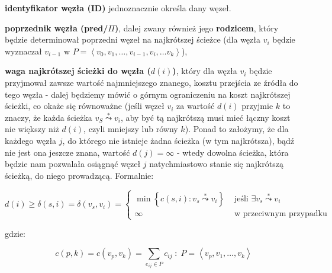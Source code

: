 \begin{myitemize}

\item \textbf{identyfikator węzła (ID)} jednoznacznie określa dany węzeł.

\item \textbf{poprzednik węzła (pred/$\Pi$)}, dalej zwany również jego \textbf{rodzicem}, który będzie determinował poprzedni węzeł na najkrótszej ścieżce (dla węzła $v_{i}$ będzie wyznaczał $v_{i-1}$ w $P = \left \langle v_{0}, v_{1}, \ldots, v_{i-1}, v_{i}, \ldots v_{k} \right \rangle $),

\item \textbf{waga najkrótszej ścieżki do węzła ($d \left( i \right) $)}, który dla węzła $v_{i}$ będzie przyjmował zawsze wartość najmniejszego znanego, kosztu przejścia ze źródła do tego węzła - dalej będziemy mówić o górnym ograniczeniu na koszt najkrótszej ścieżki, co okaże się równoważne (jeśli węzeł $v_{i}$ za wartość $ d \left( i \right) $ przyjmie $k$ to znaczy, że każda ścieżka $v_{S} \overset{*}\leadsto v_{i}$, aby być tą najkrótszą musi mieć łączny koszt nie większy niż $ d \left( i \right) $, czyli mniejszy lub równy $k$). Ponad to założymy, że dla każdego węzła $j$, do którego nie istnieje żadna ścieżka (w tym najkrótsza), bądź nie jest ona jeszcze znana, wartość $d \left( j \right) = \infty$ - wtedy dowolna ścieżka, która będzie nam pozwalała osiągnąć węzeł $j$ natychmiastowo stanie się najkrótszą ścieżką, do niego prowadzącą. Formalnie:

\begin{equation}
	d \left( i \right) \geqslant \delta \left ( s, i \right ) = \delta \left ( v_{s}, v_{i} \right ) = 
	\begin{cases}
	 \min \left\{ c \left( s,i \right ) : v_{s} \overset{*}\leadsto v_{i} \right\} & \text{ jeśli } \exists v_{s} \overset{*}\leadsto v_{i} \\ 
	 \infty & \text{ w przeciwnym przypadku }
	\end{cases}
\end{equation}

gdzie:

\begin{equation}\label{eq:sumCost}
c \left( p,k \right ) = c \left( v_{p}, v_{k} \right ) = \sum_{e_{ij} \in P} c_{ij} \; : \; P = \left \langle v_{p}, v_{1}, \ldots, v_{k} \right \rangle 
\end{equation}

\end{myitemize}

